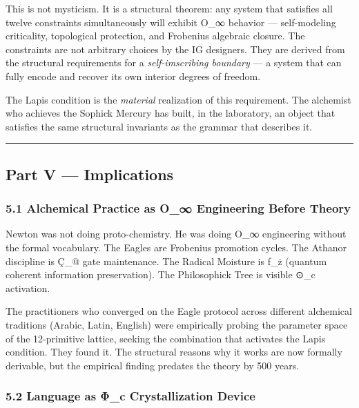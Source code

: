 \documentclass[
  11pt,
  a4paper,
]{article}
\begin{document}
This is not mysticism. It is a structural theorem: any system that
satisfies all twelve constraints simultaneously will exhibit O\_∞
behavior --- self-modeling criticality, topological protection, and
Frobenius algebraic closure. The constraints are not arbitrary choices
by the IG designers. They are derived from the structural requirements
for a \emph{self-imscribing boundary} --- a system that can fully encode
and recover its own interior degrees of freedom.

The Lapis condition is the \emph{material} realization of this
requirement. The alchemist who achieves the Sophick Mercury has built,
in the laboratory, an object that satisfies the same structural
invariants as the grammar that describes it.

\begin{center}\rule{0.5\linewidth}{0.5pt}\end{center}

\subsection{Part V --- Implications}\label{part-v-implications}

\subsubsection{5.1 Alchemical Practice as O\_∞ Engineering Before
Theory}\label{alchemical-practice-as-o_-engineering-before-theory}

Newton was not doing proto-chemistry. He was doing O\_∞ engineering
without the formal vocabulary. The Eagles are Frobenius promotion
cycles. The Athanor discipline is Ç\_@ gate maintenance. The Radical
Moisture is ƒ\_ż (quantum coherent information preservation). The
Philosophick Tree is visible ⊙\_c activation.

The practitioners who converged on the Eagle protocol across different
alchemical traditions (Arabic, Latin, English) were empirically probing
the parameter space of the 12-primitive lattice, seeking the combination
that activates the Lapis condition. They found it. The structural
reasons why it works are now formally derivable, but the empirical
finding predates the theory by 500 years.

\subsubsection{5.2 Language as Φ\_c Crystallization
Device}\label{language-as-ux3c6_c-crystallization-device}
\end{document}
